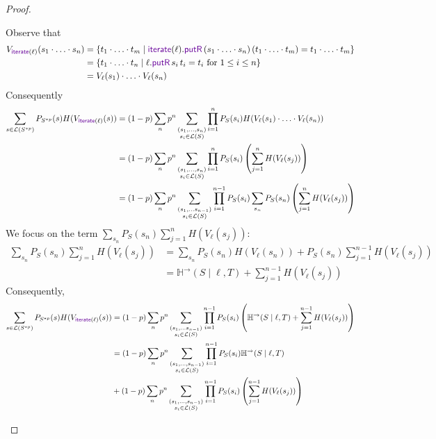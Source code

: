 \documentclass[acmsmall,screen,anonymous]{acmart}
\begin{document}
\begin{proof}
\begin{enumerate}
Observe that 
\begin{align*}
V_{\IterateLensOf{\Lens}}(s_1 \cdot \ldots \cdot s_n) &= \{t_1 \cdot \ldots \cdot t_m \; | \; \IterateLensOf{\Lens}.\PutROf{(s_1 \cdot \ldots \cdot s_n) }{(t_1 \cdot \ldots \cdot t_m)} = t_1 \cdot \ldots \cdot t_m\}\\
&= \{t_1 \cdot \ldots \cdot t_n \; | \; \ell.\PutROf{s_i}{t_i} = t_i \text{ for }1 \leq i \leq n\}\\
&= V_{\ell}(s_1) \cdot \ldots \cdot V_{\ell}(s_n)
\end{align*}
Consequently
\begin{align*}
\sum_{s \in \mathcal{L}(S^{*p})}P_{S^{*p}}(s) H(V_{\IterateLensOf{\Lens}}(s))
&= (1-p)\sum_n p^n \sum_{\substack{(s_1, \ldots, s_n)\\s_i \in \mathcal{L}(S)}} \prod_{i=1}^n P_S(s_i) H(V_{\ell}(s_1) \cdot \ldots \cdot V_{\ell}(s_n))\\
&= (1-p)\sum_n p^n \sum_{\substack{(s_1, \ldots, s_n)\\s_i \in \mathcal{L}(S)}} \prod_{i=1}^n P_S(s_i) \left(\sum_{j=1}^n H(V_{\ell}(s_j)) \right)\\
&= (1-p)\sum_n p^n \sum_{\substack{(s_1, \ldots s_{n-1}) \\ s_i \in \mathcal{L}(S)}} \prod_{i=1}^{n-1}P_S(s_i) \sum_{s_n} P_S(s_n) \left(\sum_{j=1}^n H(V_{\ell}(s_j)) \right)
\end{align*}
We focus on the term $\sum_{s_n} P_S(s_n) \sum_{j=1}^n H(V_{\ell}(s_j))$:
\begin{align*}
\sum_{s_n} P_S(s_n) \sum_{j=1}^n H(V_{\ell}(s_j)) &= \sum_{s_n} P_S(s_n)H(V_{\ell}(s_n)) + P_S(s_n) \sum_{j=1}^{n-1} H(V_{\ell}(s_j))\\
&= \mathbb{H}^{\rightarrow}(S \; | \; \ell, T) + \sum_{j=1}^{n-1}H(V_{\ell}(s_j))
\end{align*}
Consequently,
\begin{align*}
\sum_{s \in \mathcal{L}(S^{*p})}P_{S^{*p}}(s) H(V_{\IterateLensOf{\Lens}}(s))
&= (1-p)\sum_n p^n \sum_{\substack{(s_1, \ldots s_{n-1}) \\ s_i \in \mathcal{L}(S)}} \prod_{i=1}^{n-1}P_S(s_i) \left( \mathbb{H}^{\rightarrow}(S \; | \; \ell, T) + \sum_{j=1}^{n-1}H(V_{\ell}(s_j))\right)\\
&= (1-p)\sum_n p^n \sum_{\substack{(s_1, \ldots, s_{n-1})\\s_i \in \mathcal{L}(S)}} \prod_{i=1}^{n-1}P_S(s_i) \mathbb{H}^{\rightarrow}(S \; | \; \ell, T)\\
&+(1-p)\sum_n p^n \sum_{\substack{(s_1, \ldots, s_{n-1}) \\ s_i \in \mathcal{L}(S)}} \prod_{i=1}^{n-1}P_S(s_i) \left(\sum_{j=1}^{n-1}H(V_{\ell}(s_j))\right)\\

\end{align*}
\end{enumerate}
\end{proof}
\end{document}

